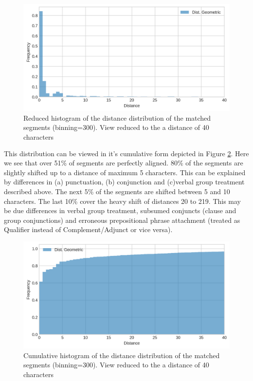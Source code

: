 \begin{figure}[!ht]
    \centering
    \includegraphics[width=.7\textwidth]{evaluation-results/figures/distance-distr-histogram}
    \caption{Reduced histogram of the distance distribution of the matched segments (binning=300). View reduced to the a distance of 40 characters}
    \label{fig:segment-distance-histogram}
\end{figure}

This distribution can be viewed in it's cumulative form depicted in Figure \ref{fig:segment-distance-distribution}. Here we see that over 51\% of segments are perfectly aligned. 80\% of the segments are slightly shifted up to a distance of maximum 5 characters. This can be explained by differences in (a) punctuation, (b) conjunction and (c)verbal group treatment described above. The next 5\% of the segments are shifted between 5 and 10 characters. The last 10\% cover the heavy shift of distances 20 to 219. This may be due differences in verbal group treatment, subsumed conjuncts (clause and group conjunctions) and erroneous prepositional phrase attachment (treated as Qualifier instead of Complement/Adjunct or vice versa). 

\begin{figure}[!ht]
    \centering
    \includegraphics[width=.7\textwidth]{evaluation-results/figures/distance-distr-cumulative}
    \caption{Cumulative histogram of the distance distribution of the matched segments (binning=300). View reduced to the a distance of 40 characters}
    \label{fig:segment-distance-distribution}
\end{figure}

